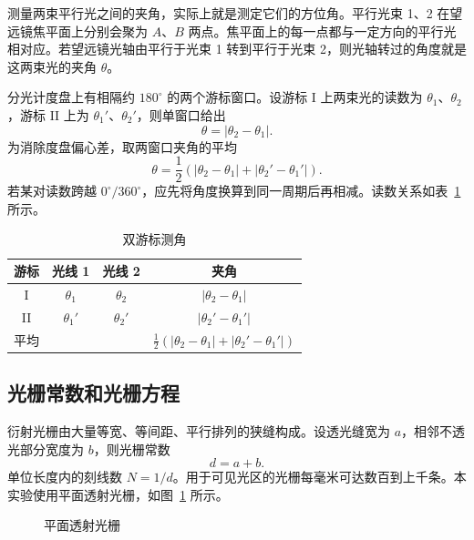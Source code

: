 \documentclass{../template/myrpt}
\begin{document}
测量两束平行光之间的夹角，实际上就是测定它们的方位角。平行光束 1、2 在望远镜焦平面上分别会聚为 $A$、$B$ 两点。焦平面上的每一点都与一定方向的平行光相对应。若望远镜光轴由平行于光束 1 转到平行于光束 2，则光轴转过的角度就是这两束光的夹角 $\theta$。

分光计度盘上有相隔约 $180^\circ$ 的两个游标窗口。设游标 I 上两束光的读数为 $\theta_1$、$\theta_2$，游标 II 上为 $\theta_1'$、$\theta_2'$，则单窗口给出
\begin{equation}
  \label{eq:angle-one}
  \theta=\lvert\theta_2-\theta_1\rvert.
\end{equation}
为消除度盘偏心差，取两窗口夹角的平均
\begin{equation}
  \label{eq:angle-mean}
  \theta=\frac{1}{2}\left(\lvert\theta_2-\theta_1\rvert+\lvert\theta_2'-\theta_1'\rvert\right).
\end{equation}
若某对读数跨越 $0^\circ/360^\circ$，应先将角度换算到同一周期后再相减。读数关系如表~\ref{table:angle-mean} 所示。

\begin{table}[htbp]
  \centering
  \caption{双游标测角}
  \label{table:angle-mean}
  \renewcommand{\arraystretch}{1.15}
  \begin{tabular}{cccc}
    \toprule
    游标 & 光线 1 & 光线 2 & 夹角 \\
    \midrule
    I & $\theta_1$ & $\theta_2$ & $\lvert\theta_2-\theta_1\rvert$ \\
    II & $\theta_1'$ & $\theta_2'$ & $\lvert\theta_2'-\theta_1'\rvert$ \\
    平均 & & & $\frac{1}{2}(\lvert\theta_2-\theta_1\rvert+\lvert\theta_2'-\theta_1'\rvert)$ \\
    \bottomrule
  \end{tabular}
\end{table}

\subsection{光栅常数和光栅方程}

衍射光栅由大量等宽、等间距、平行排列的狭缝构成。设透光缝宽为 $a$，相邻不透光部分宽度为 $b$，则光栅常数
\begin{equation}
  \label{eq:grating-constant}
  d=a+b.
\end{equation}
单位长度内的刻线数 $N=1/d$。用于可见光区的光栅每毫米可达数百到上千条。本实验使用平面透射光栅，如图~\ref{fig:grating} 所示。

\begin{figure}[!htbp]
  \centering
  
  \caption{平面透射光栅}
  \label{fig:grating}
\end{figure}
\end{document}
